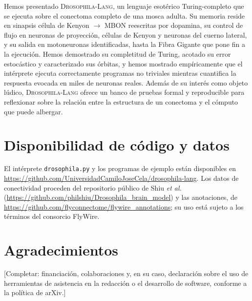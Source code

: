 \documentclass[11pt,a4paper]{article}
\theoremstyle{plain}
\theoremstyle{definition}
\theoremstyle{remark}
\newcommand{\dros}{\textup{\textsc{Drosophila-Lang}}}
\begin{document}
Hemos presentado \dros{}, un lenguaje esotérico Turing-completo que se
ejecuta sobre el conectoma completo de una mosca adulta. Su memoria reside
en sinapsis célula de Kenyon $\to$ MBON reescritas por dopamina, su control
de flujo en neuronas de proyección, células de Kenyon y neuronas del cuerno
lateral, y su salida en motoneuronas identificadas, hasta la Fibra Gigante
que pone fin a la ejecución. Hemos demostrado su completitud de Turing,
acotado su error estocástico y caracterizado sus órbitas, y hemos mostrado
empíricamente que el intérprete ejecuta correctamente programas no triviales
mientras cuantifica la respuesta evocada en miles de neuronas reales.
Además de su interés como objeto lúdico, \dros{} ofrece un banco de pruebas
formal y reproducible para reflexionar sobre la relación entre la estructura
de un conectoma y el cómputo que puede albergar.

\section*{Disponibilidad de código y datos}
El intérprete \texttt{drosophila.py} y los programas de ejemplo están
disponibles en \url{https://github.com/UniversidadCamiloJoseCela/drosophila-lang}. Los datos de
conectividad proceden del repositorio público de Shiu \emph{et al.}
(\url{https://github.com/philshiu/Drosophila_brain_model}) y las anotaciones,
de \url{https://github.com/flyconnectome/flywire_annotations}; su uso está
sujeto a los términos del consorcio FlyWire.

\section*{Agradecimientos}
[Completar: financiación, colaboraciones y, en su caso, declaración sobre el
uso de herramientas de asistencia en la redacción o el desarrollo de
software, conforme a la política de arXiv.]
\end{document}
